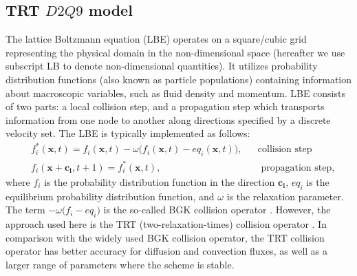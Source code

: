 \documentclass[review,12pt]{elsarticle}
\begin{document}
\subsection{TRT $D2Q9$ model}
The lattice Boltzmann equation (LBE) operates on a square/cubic grid representing the
physical domain {\color{red} in the non-dimensional space} (hereafter we use subscript LB to denote non-dimensional quantities). It utilizes
probability distribution functions (also known as particle populations)
containing information about
macroscopic variables, such as fluid density and momentum. LBE consists of
two parts: a local collision step, and a propagation step which transports
information from one node to another along  
directions specified by a discrete velocity set.
The LBE is typically implemented as follows:
\begin{equation}
\label{standard:implementation}
\begin{aligned}
&f_i^{*}(\bm{x},t)= f_i(\bm{x},t)-\omega \bigl(f_i(\bm{x},t)-eq_i(\bm{x},t)\bigr),&&\text{
collision step}\\
&f_i(\bm{x}+\bm{c_i},t+1)=f_i^{*}(\bm{x},t),&&\text{ propagation step}, 
\end{aligned}
\end{equation}
where $f_i$ is the probability distribution function in the direction $\bm{c_i}$,
 $eq_i$ is the equilibrium probability distribution function, and $\omega$ is the
relaxation parameter. The term $-\omega \bigl(f_i- eq_i\bigr)$ is the so-called BGK
collision operator \cite{bgk}. However, the approach used here is the TRT
(two-relaxation-times) collision operator \cite{ginzburg-main,ginzburg-saturated-flow}. In
comparison with the widely used BGK collision operator, the TRT collision operator has better accuracy
for diffusion and convection fluxes, as well as a larger range of parameters where the scheme is stable.
\end{document}
